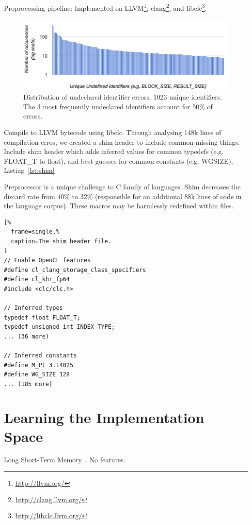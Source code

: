 \documentclass[preprint,nonatbib,10pt,nocopyrightspace]{sigplanconf}
\begin{document}
Proprocessing pipeline: Implemented on
LLVM\footnote{\url{http://llvm.org/}},
clang\footnote{\url{http://clang.llvm.org/}}, and
libclc\footnote{\url{http://libclc.llvm.org/}}.

\begin{figure}[t]
\includegraphics[width=\columnwidth]{img/undeclared-identifiers.png}
\caption{%
  Distribution of undeclared identifier errors. 1023 unique
  identifiers. The 3 most frequently undeclared identifiers account
  for 50\% of errors.%
}
\end{figure}

Compile to LLVM bytecode using libclc. Through analysing 148k lines of
compilation erros, we created a shim header to include common missing
things. Include shim header which adds inferred values for common
typedefs (e.g. FLOAT\_T to float), and best guesses for common
constants (e.g. WGSIZE). Listing~\ref{lst:shim}

Preprocessor is a unique challenge to C family of languages. Shim
decreases the discard rate from 40\% to 32\% (responsible for an
additional 88k lines of code in the language corpus). These macros may
be harmlessly redefined within files.

\lstset{language=[OpenCL]C}
\begin{lstlisting}[%
  frame=single,%
  caption=The shim header file.
]
// Enable OpenCL features
#define cl_clang_storage_class_specifiers
#define cl_khr_fp64
#include <clc/clc.h>

// Inferred types
typedef float FLOAT_T;
typedef unsigned int INDEX_TYPE;
... (36 more)

// Inferred constants
#define M_PI 3.14025
#define WG_SIZE 128
... (185 more)
\end{lstlisting}


\section{Learning the Implementation Space}\label{sec:ml}

Long Short-Term Memory~\cite{Hochreiter1997}. No features.
\end{document}
